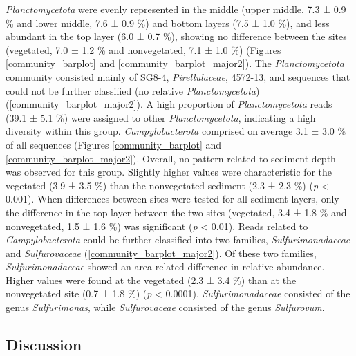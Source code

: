 \documentclass[12pt,]{article}
\begin{document}
\emph{Planctomycetota} were evenly represented in the middle (upper
middle, 7.3 ± 0.9 \si{\percent} and lower middle, 7.6 ± 0.9
\si{\percent}) and bottom layers (7.5 ± 1.0 \si{\percent}), and less
abundant in the top layer (6.0 ± 0.7 \si{\percent}), showing no
difference between the sites (vegetated, 7.0 ± 1.2 \si{\percent} and
nonvegetated, 7.1 ± 1.0 \si{\percent}) (Figures \ref{community_barplot}
and \ref{community_barplot_major2}). The \emph{Planctomycetota}
community consisted mainly of SG8-4, \emph{Pirellulaceae}, 4572-13, and
sequences that could not be further classified (no relative
\emph{Planctomycetota}) (\autoref{community_barplot_major2}). A high
proportion of \emph{Planctomycetota} reads (39.1 ± 5.1 \si{\percent})
were assigned to other \emph{Planctomycetota}, indicating a high
diversity within this group. \emph{Campylobacterota} comprised on
average 3.1 ± 3.0 \si{\percent} of all sequences (Figures
\ref{community_barplot} and \ref{community_barplot_major2}). Overall, no
pattern related to sediment depth was observed for this group. Slightly
higher values were characteristic for the vegetated (3.9 ± 3.5
\si{\percent}) than the nonvegetated sediment (2.3 ± 2.3 \si{\percent})
(\emph{p} \textless{} 0.001). When differences between sites were tested
for all sediment layers, only the difference in the top layer between
the two sites (vegetated, 3.4 ± 1.8 \si{\percent} and nonvegetated, 1.5
± 1.6 \si{\percent}) was significant (\emph{p} \textless{} 0.01). Reads
related to \emph{Campylobacterota} could be further classified into two
families, \emph{Sulfurimonadaceae} and \emph{Sulfurovaceae}
(\autoref{community_barplot_major2}). Of these two families,
\emph{Sulfurimonadaceae} showed an area-related difference in relative
abundance. Higher values were found at the vegetated (2.3 ± 3.4
\si{\percent}) than at the nonvegetated site (0.7 ± 1.8 \si{\percent})
(\emph{p} \textless{} 0.0001). \emph{Sulfurimonadaceae} consisted of the
genus \emph{Sulfurimonas}, while \emph{Sulfurovaceae} consisted of the
genus \emph{Sulfurovum}.

\newpage

\hypertarget{discussion}{%
\subsection{Discussion}\label{discussion}}
\end{document}
